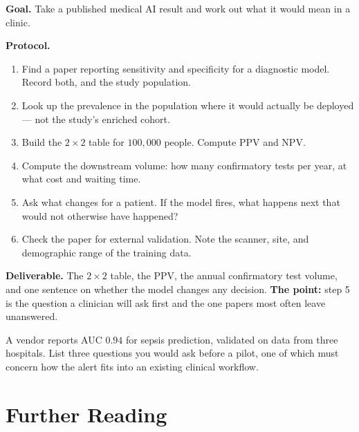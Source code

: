 \begin{practicallab}
\textbf{Goal.} Take a published medical AI result and work out what it would
mean in a clinic.

\textbf{Protocol.}
\begin{enumerate}
  \item Find a paper reporting sensitivity and specificity for a diagnostic
        model. Record both, and the study population.
  \item Look up the prevalence in the population where it would actually be
        deployed --- not the study's enriched cohort.
  \item Build the $2\times2$ table for $100{,}000$ people. Compute PPV and NPV.
  \item Compute the downstream volume: how many confirmatory tests per year,
        at what cost and waiting time.
  \item Ask what changes for a patient. If the model fires, what happens next
        that would not otherwise have happened?
  \item Check the paper for external validation. Note the scanner, site, and
        demographic range of the training data.
\end{enumerate}

\textbf{Deliverable.} The $2\times2$ table, the PPV, the annual confirmatory
test volume, and one sentence on whether the model changes any decision.
\textbf{The point:} step 5 is the question a clinician will ask first and the
one papers most often leave unanswered.
\end{practicallab}

\begin{checkpoint}
A vendor reports AUC $0.94$ for sepsis prediction, validated on data from three
hospitals. List three questions you would ask before a pilot, one of which must
concern how the alert fits into an existing clinical workflow.
\end{checkpoint}


\section{Further Reading}

